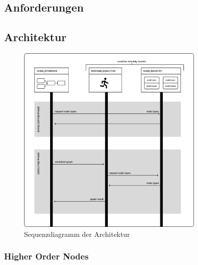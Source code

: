\documentclass[ngerman]{article}
\begin{document}
\subsection{Anforderungen}
\subsection{Architektur}

\begin{figure}[htbp]
    \centering
    \includegraphics[width=0.8\textwidth]{graphics/OVERVIEW_SEQUENCE.pdf}
    \caption{Sequenzdiagramm der Architektur}
    \label{fig:your_label}
\end{figure}

\subsubsection{Higher Order Nodes}
\end{document}
